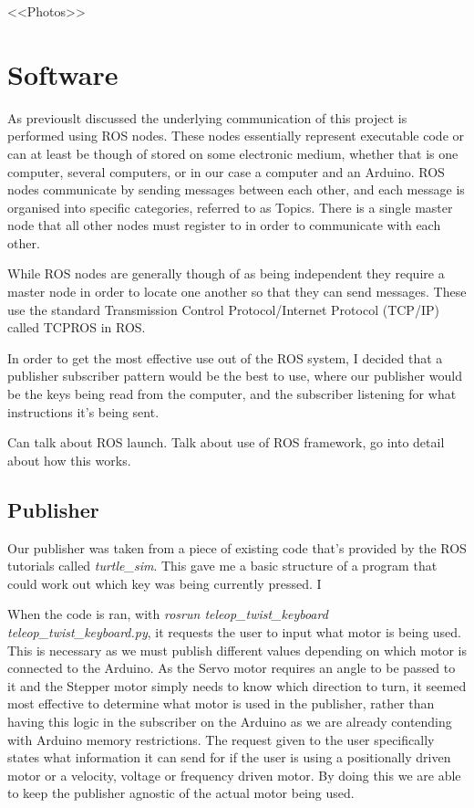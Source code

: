 \documentclass{l4proj}
\begin{document}
<<Photos>>


\section{Software}
As previouslt discussed the underlying communication of this project is performed using ROS nodes. These nodes essentially represent executable code or can at least be though of  stored on some electronic medium, whether that is one computer, several computers, or in our case a computer and an Arduino. ROS nodes communicate by sending messages between each other, and each message is organised into specific categories, referred to as Topics. There is a single master node that all other nodes must register to in order to communicate with each other. 

While ROS nodes are generally though of as being independent they require a master node in order to locate one another so that they can send messages. These use the standard Transmission Control Protocol/Internet Protocol (TCP/IP) called TCPROS in ROS. 

In order to get the most effective use out of the ROS system, I decided that a publisher subscriber pattern would be the best to use, where our publisher would be the keys being read from the computer, and the subscriber listening for what instructions it's being sent. 
 
Can talk about ROS launch. 
Talk about use of ROS framework, go into detail about how this works. 

\subsection{Publisher}
Our publisher was taken from a piece of existing code that's provided by the ROS tutorials called \textit{turtle\_sim}. This gave me a basic structure of a program that could work out which key was being currently pressed. I

When the code is ran, with \textit{rosrun teleop\_twist\_keyboard teleop\_twist\_keyboard.py}, it requests the user to input what motor is being used. This is necessary as we must publish different values depending on which motor is connected to the Arduino. As the Servo motor requires an angle to be passed to it and the Stepper motor simply needs to know which direction to turn, it seemed most effective to determine what motor is used in the publisher, rather than having this logic in the subscriber on the Arduino as we are already contending with Arduino memory restrictions. The request given to the user specifically states what information it can send for if the user is using a positionally driven motor or a velocity, voltage or frequency driven motor. By doing this we are able to keep the publisher agnostic of the actual motor being used. 
\end{document}
